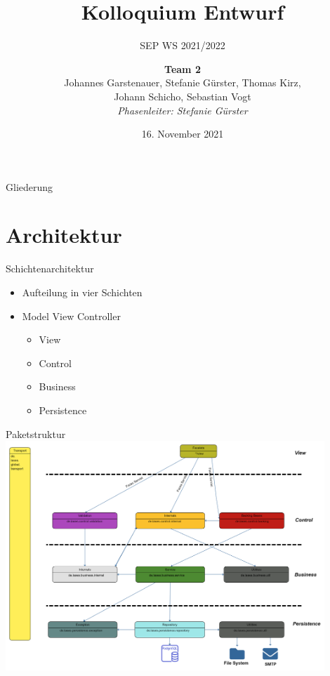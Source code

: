\documentclass{beamer}
\title{Kolloquium Entwurf}
\subtitle{SEP WS 2021/2022}
\date{\small 16. November 2021}
\author{\textbf{Team 2} \\ \small {Johannes Garstenauer, Stefanie Gürster, Thomas Kirz,\\ Johann Schicho, Sebastian Vogt} \\ \vspace{0.5cm}\emph{Phasenleiter: Stefanie Gürster}\normalsize}
\begin{document}
    \begin{frame}
        \titlepage
    \end{frame}

    \begin{frame}{Gliederung}
        \tableofcontents
    \end{frame}


    \section{Architektur}

    \begin{frame}{Schichtenarchitektur}
        \begin{itemize}

            \item Aufteilung in vier Schichten \pause
            \item Model View Controller
            \pause
            \begin{itemize}
                \item View
                \item Control
                \item Business
                \item Persistence
            \end{itemize}

        \end{itemize}
    \end{frame}

    \begin{frame}{Paketstruktur}
        \centering
        \includegraphics[width=0.9\textwidth]{excerpts/paketdiagramm_for_presentation}
    \end{frame}
\end{document}

